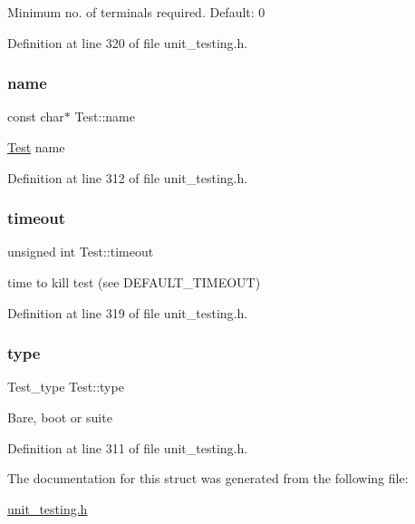 Minimum no. of terminals required. Default\+: 0 

Definition at line 320 of file unit\+\_\+testing.\+h.

\mbox{\label{structTest_ae44674e48b203d9c26e04e09b6fe5b61}} 
\subsubsection{\texorpdfstring{name}{name}}
{\footnotesize\ttfamily const char$\ast$ Test\+::name}

\hyperlink{structTest}{Test} name 

Definition at line 312 of file unit\+\_\+testing.\+h.

\mbox{\label{structTest_a80e78f2e6aeed2a6e5b7c705ce5a1493}} 
\subsubsection{\texorpdfstring{timeout}{timeout}}
{\footnotesize\ttfamily unsigned int Test\+::timeout}

time to kill test (see D\+E\+F\+A\+U\+L\+T\+\_\+\+T\+I\+M\+E\+O\+UT) 

Definition at line 319 of file unit\+\_\+testing.\+h.

\mbox{\label{structTest_a5074007b777ea0958966027197c17792}} 
\subsubsection{\texorpdfstring{type}{type}}
{\footnotesize\ttfamily Test\+\_\+type Test\+::type}

Bare, boot or suite 

Definition at line 311 of file unit\+\_\+testing.\+h.



The documentation for this struct was generated from the following file\+:\begin{DoxyCompactItemize}
\item 
\hyperlink{unit__testing_8h}{unit\+\_\+testing.\+h}\end{DoxyCompactItemize}
